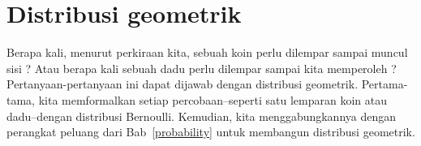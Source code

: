 %
%
%
%




\section{Distribusi geometrik}
\label{geomDist}

Berapa kali, menurut perkiraan kita, sebuah koin perlu dilempar sampai
muncul sisi ? Atau berapa kali sebuah dadu perlu dilempar
sampai kita memperoleh ? Pertanyaan-pertanyaan ini dapat dijawab
dengan distribusi geometrik. Pertama-tama, kita memformalkan setiap
percobaan--seperti satu lemparan koin atau dadu--dengan distribusi
Bernoulli. Kemudian, kita menggabungkannya dengan perangkat peluang dari
Bab~\ref{probability} untuk membangun distribusi geometrik.

